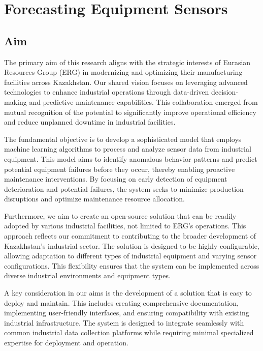 \chapter{Forecasting Equipment Sensors}
\label{chap:methodology}
\setlength{\parskip}{1em}

\section{Aim}

The primary aim of this research aligns with the strategic interests of Eurasian Resources Group (ERG) in modernizing and optimizing their manufacturing facilities across Kazakhstan. Our shared vision focuses on leveraging advanced technologies to enhance industrial operations through data-driven decision-making and predictive maintenance capabilities. This collaboration emerged from mutual recognition of the potential to significantly improve operational efficiency and reduce unplanned downtime in industrial facilities.

The fundamental objective is to develop a sophisticated model that employs machine learning algorithms to process and analyze sensor data from industrial equipment. This model aims to identify anomalous behavior patterns and predict potential equipment failures before they occur, thereby enabling proactive maintenance interventions. By focusing on early detection of equipment deterioration and potential failures, the system seeks to minimize production disruptions and optimize maintenance resource allocation.

Furthermore, we aim to create an open-source solution that can be readily adopted by various industrial facilities, not limited to ERG's operations. This approach reflects our commitment to contributing to the broader development of Kazakhstan's industrial sector. The solution is designed to be highly configurable, allowing adaptation to different types of industrial equipment and varying sensor configurations. This flexibility ensures that the system can be implemented across diverse industrial environments and equipment types.

A key consideration in our aims is the development of a solution that is easy to deploy and maintain. This includes creating comprehensive documentation, implementing user-friendly interfaces, and ensuring compatibility with existing industrial infrastructure. The system is designed to integrate seamlessly with common industrial data collection platforms while requiring minimal specialized expertise for deployment and operation.


